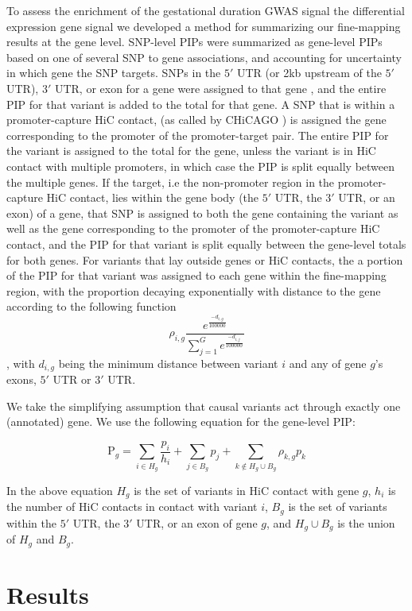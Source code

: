 To assess the enrichment of the gestational duration GWAS signal the differential expression gene signal we developed a method for summarizing our fine-mapping results at the gene level.  SNP-level PIPs were summarized as gene-level
PIPs based on one of several SNP to gene associations, and accounting for uncertainty in which gene the SNP targets.  SNPs in the \(5'\) UTR (or 2kb upstream of the \(5'\) UTR), \(3'\) UTR, or exon for a gene were assigned to that gene
, and the entire PIP for that variant is added to the total for that gene. A SNP that is within a promoter-capture HiC contact, (as called by CHiCAGO \cite{chicago}) is assigned the gene corresponding to the promoter of the
promoter-target pair.  The entire PIP for the variant is assigned to the total for the gene, unless the variant is in HiC contact with multiple promoters, in which case the PIP is split equally between the multiple genes.
If the target, i.e the non-promoter region in the promoter-capture HiC contact, lies within the gene body (the \(5'\) UTR, the \(3'\) UTR, or an exon) of a gene, that SNP is assigned to both the gene containing the variant
as well as the gene corresponding to the promoter of the promoter-capture HiC contact, and the PIP for that variant is split equally between the gene-level totals for both genes.
For variants that lay outside genes or HiC contacts, the a portion of the PIP for that variant was assigned to each gene within the fine-mapping region, with the proportion decaying exponentially with distance to the gene according
to the following function
$$\rho_{i,g}\frac{e^{\frac{-d_{i,g}}{100000}}}{\sum_{j=1}^G e^{\frac{-d_{i,j}}{100000}}}$$, with $d_{i,g}$ being the minimum distance between variant $i$ and any of gene $g$'s exons, \(5'\) UTR or \(3'\) UTR.  

We take the simplifying assumption that causal variants act through exactly one (annotated) gene. We use the following equation for the gene-level PIP:

$$\text{P}_{g} = \sum_{i \in H_g}  \frac{p_i}{h_i} + \sum_{j \in B_g} p_j + \sum_{k \not\in H_g \cup B_g} \rho_{k,g}p_k$$

In the above equation $H_g$ is the set of variants in HiC contact with gene $g$, $h_i$ is the number of HiC contacts in contact with variant $i$, $B_g$ is the set of variants within the \(5'\) UTR, the \(3'\) UTR, or an exon of gene $g$, and $H_g \cup B_g$ is the union of $H_g$ and $B_g$.

\section{Results}\label{sec:orgb8d6bf0}

